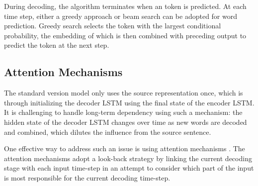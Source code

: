 During decoding, the algorithm terminates when an \eos token is predicted.
At each time step, either a greedy approach or beam search can be adopted for word prediction.
Greedy search selects the token with the largest conditional probability, the embedding of which is then combined with preceding output to predict the token at the next step. 

\subsection{Attention Mechanisms}
The standard version \sts model only uses the source representation once, which is through initializing the decoder LSTM using the final state of the encoder  LSTM. 
It is challenging to handle long-term dependency using such a mechanism: the hidden state of the decoder LSTM changes over time as new words are decoded and combined, which 
dilutes the influence from the source sentence.  

One effective way to address such an issue is using attention mechanisms . 
The attention mechanisms
adopt a look-back strategy by
linking the current decoding stage with each input time-step
in an attempt to consider which part of the
input is most responsible for the current decoding time-step. 

